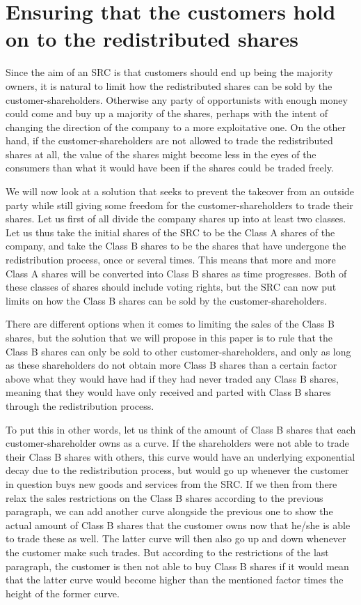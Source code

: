 \documentclass{article}
\begin{document}
\section{Ensuring that the customers hold on to the redistributed shares}


Since the aim of an SRC is that customers should end up being the majority owners, it is natural to limit how the redistributed shares can be sold by the customer-shareholders. Otherwise any party of opportunists with enough money could come and buy up a majority of the shares, perhaps with the intent of changing the direction of the company to a more exploitative one. On the other hand, if the customer-shareholders are not allowed to trade the redistributed shares at all, the value of the shares might become less in the eyes of the consumers than what it would have been if the shares could be traded freely. 

We will now look at a solution that seeks to prevent the takeover from an outside party while still giving some freedom for the customer-shareholders to trade their shares. Let us first of all divide the company shares up into at least two classes. Let us thus take the initial shares of the SRC to be the Class A shares of the company, and take the Class B shares to be the shares that have undergone the redistribution process, once or several times. This means that more and more Class A shares will be converted into Class B shares as time progresses. Both of these classes of shares should include voting rights, but the SRC can now put limits on how the Class B shares can be sold by the customer-shareholders. 

There are different options when it comes to limiting the sales of the Class B shares, but the solution that we will propose in this paper is to rule that the Class B shares can %
only be sold to other customer-shareholders, and only as long as these shareholders do not obtain more Class B shares than a certain factor above what they would have had if they had never traded any Class B shares, meaning that they would have only received and parted with Class B shares through the redistribution process. 

To put this in other words, let us think of the amount of Class B shares that each customer-shareholder owns as a curve. If the shareholders were not able to trade their Class B shares with others, this curve would have an underlying exponential decay due to the redistribution process, but would go up whenever the customer in question buys new goods and services from the SRC. If we then from there relax the sales restrictions on the Class B shares according to the previous paragraph, we can add another curve alongside the previous one to show the actual amount of Class B shares that the customer owns now that he/she is able to trade these as well. The latter curve will then also go up and down whenever the customer make such trades. But according to the restrictions of the last paragraph, the customer is then not able to buy Class B shares if it would mean that the latter curve would become higher than the mentioned factor times the height of the former curve.
\end{document}
